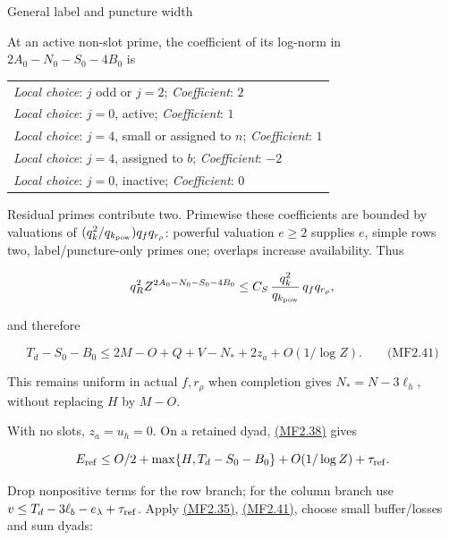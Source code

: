 \hypertarget{general-label-and-puncture-width}{}

\label{general-label-and-puncture-width}

General label and puncture width

At an active non-slot prime, the coefficient of its log-norm in \(2A_0-N_0-S_0-4B_0\) is

\begingroup\small
\begin{longtable}{@{}p{\linewidth}@{}}
\toprule
\endhead
\bottomrule
\endlastfoot
\textit{Local choice}: \(j\) odd or \(j=2\); \enspace \textit{Coefficient}: \(2\) \\
\addlinespace[3pt]
\textit{Local choice}: \(j=0\), active; \enspace \textit{Coefficient}: \(1\) \\
\addlinespace[3pt]
\textit{Local choice}: \(j=4\), small or assigned to \(n\); \enspace \textit{Coefficient}: \(1\) \\
\addlinespace[3pt]
\textit{Local choice}: \(j=4\), assigned to \(b\); \enspace \textit{Coefficient}: \(-2\) \\
\addlinespace[3pt]
\textit{Local choice}: \(j=0\), inactive; \enspace \textit{Coefficient}: \(0\) \\
\end{longtable}
\endgroup

Residual primes contribute two. Primewise these coefficients are bounded by valuations of \((q_k^2/q_{k_{\rm pow}})q_fq_{r_\rho}\): powerful valuation \(e\ge2\) supplies \(e\), simple rows two, label/puncture-only primes one; overlaps increase availability. Thus

\[
q_R^2 Z^{2A_0-N_0-S_0-4B_0}
\le C_S\,\frac{q_k^2}{q_{k_{\rm pow}}}\,q_fq_{r_\rho},
\]

and therefore

\hypertarget{mf:eq:B2.41}{}

\label{mf:eq:B2.41}

\[
T_d-S_0-B_0
\le2M-O+Q+V-N_*+2z_a+O(1/\log Z).
\qquad\text{(MF2.41)}
\]

This remains uniform in actual \(f,r_\rho\) when completion gives \(N_*=N-3\ell_h\), without replacing \(H\) by \(M-O\).

With no slots, \(z_a=u_h=0\). On a retained dyad, \protect\hyperlink{mf:eq:B2.38}{(MF2.38)} gives

\[
E_{\rm ref}\le O/2+\max\{H,T_d-S_0-B_0\}
+O(1/\log Z)+\tau_{\rm ref}.
\]

Drop nonpositive terms for the row branch; for the column branch use \(v\le T_d-3\ell_b-e_\lambda+\tau_{\rm ref}\). Apply \protect\hyperlink{mf:eq:B2.35}{(MF2.35)}, \protect\hyperlink{mf:eq:B2.41}{(MF2.41)}, choose small buffer/losses and sum dyads:

